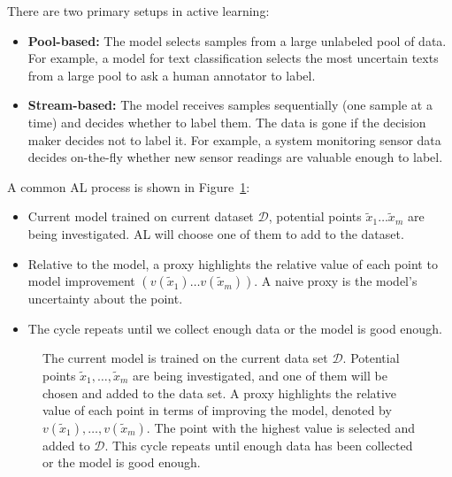 \documentclass[
  letterpaper,
  numbers=noenddot,
  DIV=11]{scrreprt}
\theoremstyle{definition}
\theoremstyle{plain}
\theoremstyle{plain}
\theoremstyle{remark}
\begin{document}
There are two primary setups in active learning:

\begin{itemize}
\item
  \textbf{Pool-based:} The model selects samples from a large unlabeled
  pool of data. For example, a model for text classification selects the
  most uncertain texts from a large pool to ask a human annotator to
  label.
\item
  \textbf{Stream-based:} The model receives samples sequentially (one
  sample at a time) and decides whether to label them. The data is gone
  if the decision maker decides not to label it. For example, a system
  monitoring sensor data decides on-the-fly whether new sensor readings
  are valuable enough to label.
\end{itemize}

A common AL process is shown in Figure~\ref{fig-schema}:

\begin{itemize}
\item
  Current model trained on current dataset \(\mathcal{D}\), potential
  points \(\tilde{x}_1 \dots \tilde{x}_m\) are being investigated. AL
  will choose one of them to add to the dataset.
\item
  Relative to the model, a proxy highlights the relative value of each
  point to model improvement \((v(\tilde{x}_1) \dots v(\tilde{x}_m) )\).
  A naive proxy is the model's uncertainty about the point.
\item
  The cycle repeats until we collect enough data or the model is good
  enough.
\end{itemize}

\begin{figure}


\caption{\label{fig-schema}The current model is trained on the current
data set \(\mathcal{D}\). Potential points
\(\tilde{x}_1, \ldots, \tilde{x}_m\) are being investigated, and one of
them will be chosen and added to the data set. A proxy highlights the
relative value of each point in terms of improving the model, denoted by
\(v(\tilde{x}_1), \ldots, v(\tilde{x}_m)\). The point with the highest
value is selected and added to \(\mathcal{D}\). This cycle repeats until
enough data has been collected or the model is good enough.}

\end{figure}%
\end{document}
